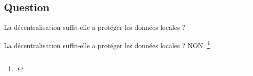 \documentclass[notheorems]{beamer}
\begin{document}
\subsection{Question}
\begin{frame}
  \centering
  La décentralisation suffit-elle a protéger les données locales ?
\end{frame}

\begin{frame}
  \centering
  La décentralisation suffit-elle a protéger les données locales ? \textcolor{CaDarker}{NON.} \footcite{geiping2020inverting}
  \begin{figure}
    \begin{minipage}{.3\textwidth}
      \centering
    \end{minipage}\quad%
    \begin{minipage}{.3\textwidth}
      \centering

\end{minipage}
\end{figure}
\end{frame}
\end{document}
